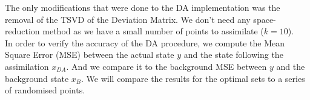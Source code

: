 The only modifications that were done to the DA implementation was the removal of the TSVD of the Deviation Matrix. We don't need  any space-reduction method as we have a small number of points to assimilate ($k=10$).  \\


In order to verify the accuracy of the DA procedure, we compute the Mean Square Error (MSE) between the actual state $y$ and the state following the assimilation $x_{DA}$. And we compare it to the background MSE between $y$ and the background state $x_{B}$. We will compare the results for the optimal sets to a series of randomised points. 

